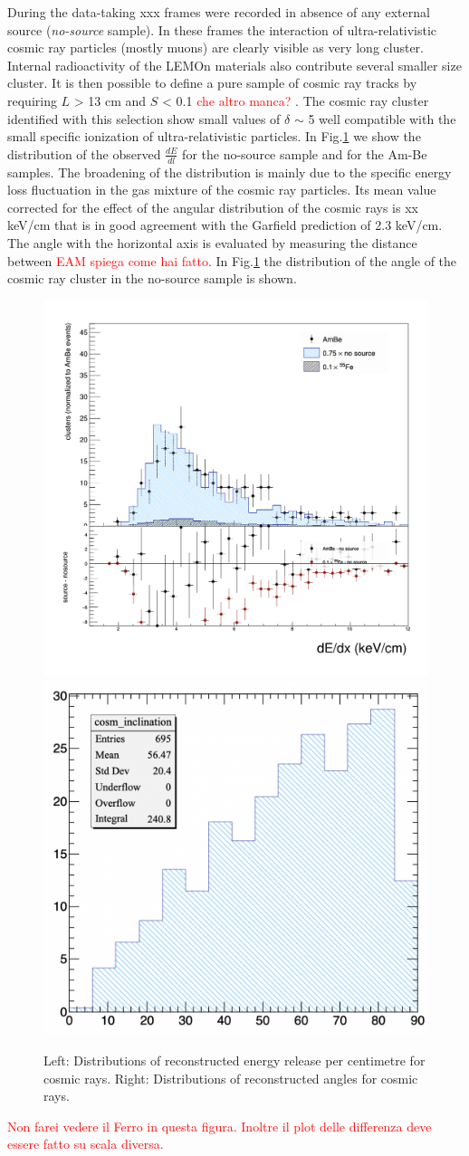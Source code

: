 \documentclass[12pt]{iopart}
\begin{document}
 During the data-taking xxx frames were recorded in absence of any external source ({\it no-source} sample). In these frames the interaction of ultra-relativistic cosmic ray particles (mostly muons) are clearly visible  as  very long cluster. Internal radioactivity of the LEMOn materials  also contribute several smaller size cluster.  It is then possible to define a pure sample of cosmic ray tracks by requiring $L$ > 13 cm and $S$ < 0.1  \textcolor{red}{che altro manca? }. The cosmic ray cluster identified with this selection show small values of  $\delta$ $\sim $ 5 well compatible with the small specific ionization of ultra-relativistic particles. 
 In Fig.\ref{fig:cosmics} we show the distribution of the observed $\frac{dE}{dl}$ for the no-source sample and for the Am-Be samples. The broadening of the distribution is mainly due to the specific energy loss fluctuation in the gas mixture of the cosmic ray particles.   Its mean value corrected for the effect of the angular distribution of the cosmic rays is   xx keV/cm that is in good agreement with the Garfield prediction of 2.3 keV/cm.  The angle with the horizontal axis is evaluated by  measuring the distance between \textcolor{red}{EAM spiega come hai fatto}. In Fig.\ref{fig:cosmics} the distribution   of the  angle of the cosmic ray cluster in the no-source sample is shown.
 
 
 \begin{figure}[ht]
	\centering
	\includegraphics[width=0.45\linewidth]{dEdx_cosmics.png}
	\includegraphics[width=0.45\linewidth]{cosmic_angle.png}
  	\caption{Left: Distributions of reconstructed energy release per centimetre for cosmic rays. Right: Distributions of reconstructed angles for cosmic rays. }
  	\label{fig:cosmics}
\end{figure}
\textcolor{red}{Non farei vedere il Ferro in questa figura. Inoltre il plot delle differenza deve essere fatto su scala diversa. }
\end{document}
